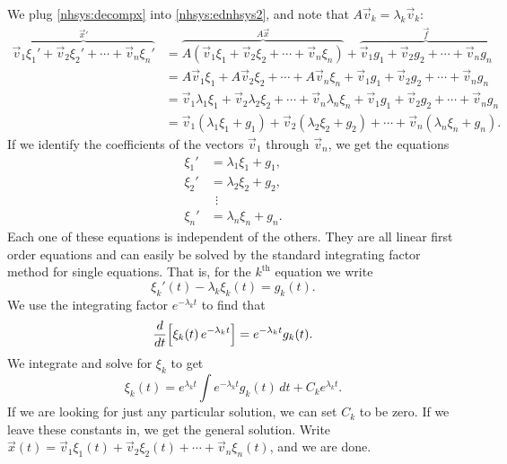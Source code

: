 We plug \eqref{nhsys:decompx} into \eqref{nhsys:ednhsys2}, and note that
$A \vec{v}_k = \lambda_k \vec{v}_k$:
\begin{equation*}
\begin{split}
\overbrace{
\vec{v}_1 \xi_1' + 
\vec{v}_2 \xi_2' + \cdots +
\vec{v}_n \xi_n'
}^{{\vec{x}}'}
& =
\overbrace{
A \left( \vec{v}_1 \xi_1 + 
\vec{v}_2 \xi_2 + \cdots +
\vec{v}_n \xi_n \right)
}^{A\vec{x}}
+
\overbrace{
\vec{v}_1 g_1 + 
\vec{v}_2 g_2 + \cdots +
\vec{v}_n g_n
}^{\vec{f}}
\\
& = 
A \vec{v}_1 \xi_1 + 
A \vec{v}_2 \xi_2 + \cdots +
A \vec{v}_n \xi_n
+
\vec{v}_1 g_1 + 
\vec{v}_2 g_2 + \cdots +
\vec{v}_n g_n
\\
& =
\vec{v}_1 \lambda_1 \xi_1 + 
\vec{v}_2 \lambda_2 \xi_2 + \cdots +
\vec{v}_n \lambda_n \xi_n
+
\vec{v}_1 g_1 + 
\vec{v}_2 g_2 + \cdots +
\vec{v}_n g_n
\\
& =
\vec{v}_1 ( \lambda_1 \xi_1 + g_1 ) +
\vec{v}_2 ( \lambda_2 \xi_2 + g_2 ) + \cdots + 
\vec{v}_n ( \lambda_n \xi_n + g_n ) .
\end{split}
\end{equation*}
If we identify the coefficients of the vectors $\vec{v}_1$ through
$\vec{v}_n$, we get the
equations
\begin{align*}
\xi_1' & = \lambda_1 \xi_1 + g_1 , \\
\xi_2' & = \lambda_2 \xi_2 + g_2 , \\
& ~~ \vdots \\
\xi_n' & = \lambda_n \xi_n + g_n .
\end{align*}
Each one of these equations is independent of the others.  They are all
linear first order equations and can easily be solved by the standard
integrating factor method for single equations.
That is, for the $k^{\text{th}}$
equation we write
\begin{equation*}
\xi_k'(t) - \lambda_k \xi_k(t) = g_k(t) .
\end{equation*}
We use the integrating factor $e^{-\lambda_k t}$ to find that
\begin{equation*}
\frac{d}{dt}\Bigl[ \xi_k(t) \, e^{-\lambda_k t} \Bigr] = 
e^{-\lambda_k t} g_k(t) .
\end{equation*}
We integrate and solve for $\xi_k$ to get
\begin{equation*}
\xi_k(t) =  e^{\lambda_k t} 
\int e^{-\lambda_k t} g_k(t) \,dt + C_k e^{\lambda_k t} .
\end{equation*}
If we are looking for just any particular solution, we can set
$C_k$ to be zero.  If we leave these constants in, we get the
general solution.  Write
$\vec{x}(t) =
\vec{v}_1 \xi_1(t) + 
\vec{v}_2 \xi_2(t) + \cdots +
\vec{v}_n \xi_n(t)$, and we are done.

